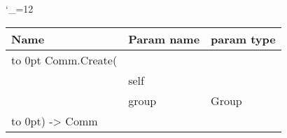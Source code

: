 \begingroup \catcode`\_=12 \tt
\begin{tabular}{lll}
\toprule
\textrm{Name}&\textrm{Param name}&\textrm{param type}\\
\midrule
\hbox to 0pt {Comm.Create(\hss}\\
& self\\
& group & Group\\
\hbox to 0pt{) -> Comm\hss}\\
\bottomrule
\end{tabular}
\endgroup
